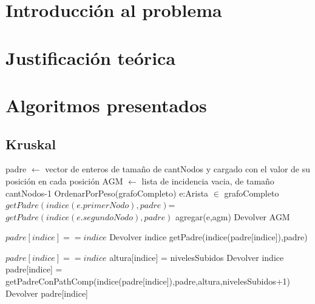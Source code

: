 \documentclass[11pt,a4paper]{article}
\begin{document}

\fecha{\today}



\maketitle

\newpage
%

\section{Introducción al problema}
\section{Justificación teórica}
\section{Algoritmos presentados}
\subsection{Kruskal}
\begin{codebox}
\li padre $\gets$ vector de enteros de tamaño de cantNodos y cargado con el valor de su posición en cada posición
\li AGM $\gets$ lista de incidencia vacia, de tamaño cantNodos-1
\li OrdenarPorPeso(grafoCompleto)
\li \For e:Arista $\in$ grafoCompleto 
\li \If $getPadre(indice(e.primerNodo), padre) $=$ getPadre(indice(e.segundoNodo),padre)$ \Then
\li agregar(e,agm)
\li \End
\li \End
\li Devolver AGM
\end{codebox}

\begin{codebox}
\li \If $padre[indice] == indice$ \Then
\li Devolver indice
\li \Else
\li getPadre(indice(padre[indice]),padre)
\li \End
\end{codebox}


\begin{codebox}
\li \If $padre[indice] == indice$ \Then
\li altura[indice] = nivelesSubidos
\li Devolver indice
\li \Else
\li padre[indice] = getPadreConPathComp(indice(padre[indice]),padre,altura,nivelesSubidos+1)
\li Devolver padre[indice]
\li \End
\end{codebox}
\end{document}
